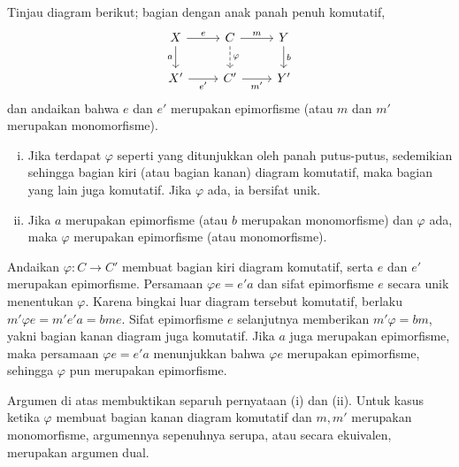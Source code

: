 \begin{lema}\label{prop:epi-mono-morphism}
	Tinjau diagram berikut; bagian dengan anak panah penuh komutatif,
	\[\begin{tikzcd}
		X \arrow[r, "e"] \arrow[d, "a"'] & C \arrow[r, "m"] \arrow[dashed, d, "\varphi"] & Y \arrow[d, "b"] \\
		X' \arrow[r, "{e'}"'] & C' \arrow[r, "{m'}"'] & Y'
	\end{tikzcd}\]
	dan andaikan bahwa $e$ dan $e'$ merupakan epimorfisme (atau $m$ dan $m'$
	merupakan monomorfisme).
	\begin{enumerate}[(i)]
		\item Jika terdapat $\varphi$ seperti yang ditunjukkan oleh panah
		putus-putus, sedemikian sehingga bagian kiri (atau bagian kanan) diagram
		komutatif, maka bagian yang lain juga komutatif. Jika $\varphi$ ada, ia
		bersifat unik.
		\item Jika $a$ merupakan epimorfisme (atau $b$ merupakan monomorfisme) dan
		$\varphi$ ada, maka $\varphi$ merupakan epimorfisme (atau monomorfisme).
	\end{enumerate}
\end{lema}

\begin{bukti}
	Andaikan $\varphi: C \to C'$ membuat bagian kiri diagram komutatif, serta
	$e$ dan $e'$ merupakan epimorfisme. Persamaan $\varphi e = e' a$ dan sifat
	epimorfisme $e$ secara unik menentukan $\varphi$. Karena bingkai luar
	diagram tersebut komutatif, berlaku
	$m' \varphi e = m' e' a = bm e$. Sifat epimorfisme $e$ selanjutnya
	memberikan $m'\varphi = bm$, yakni bagian kanan diagram juga komutatif.
	Jika $a$ juga merupakan epimorfisme, maka persamaan
	$\varphi e = e' a$ menunjukkan bahwa $\varphi e$ merupakan epimorfisme,
	sehingga $\varphi$ pun merupakan epimorfisme.

	Argumen di atas membuktikan separuh pernyataan (i) dan (ii). Untuk
	kasus ketika $\varphi$ membuat bagian kanan diagram komutatif dan $m,m'$
	merupakan monomorfisme, argumennya sepenuhnya serupa, atau secara ekuivalen,
	merupakan argumen dual.
\end{bukti}

